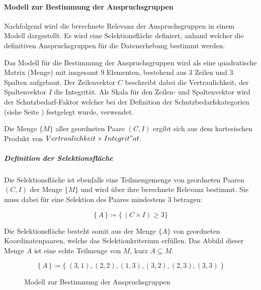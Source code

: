 \documentclass[../../main.tex]{subfiles}
\begin{document}
\paragraph*{Modell zur Bestimmung der Anspruchsgruppen}\mbox{}

\begin{sloppypar}
Nachfolgend wird die berechnete Relevanz der Anspruchsgruppen in einem Modell dargestellt. Es wird eine Selektionsfläche definiert, anhand welcher die definitiven Anspruchsgruppen für die Datenerhebung bestimmt werden.

Das Modell für die Bestimmung der Anspruchsgruppen wird als eine quadratische Matrix (Menge) mit insgesamt 9 Elementen, bestehend aus 3 Zeilen und 3 Spalten aufgebaut. Der Zeilenvektor $C$ beschreibt dabei die Vertraulichkeit, der Spaltenvektor $I$ die Integrität. Als Skala für den Zeilen- und Spaltenvektor wird der Schutzbedarf-Faktor welcher bei der Definition der Schutzbedarfskategorien (siehe Seite \pageref{Schutzbedarfskategorien}) festgelegt wurde, verwendet.

Die Menge $\{M\}$ aller geordneten Paare $(C,I)$ ergibt sich aus dem kartesischen Produkt von $Vertraulichkeit \times Integrit"at$. 
\end{sloppypar}

\subparagraph*{Definition der Selektionsfläche}\mbox{}

\begin{sloppypar}
Die Selektionsfläche ist ebenfalls eine Teilmengemenge von geordneten Paaren $(C,I)$ der Menge $\{M\}$ und wird über ihre berechnete Relevanz bestimmt. Sie muss dabei für eine Selektion des Paares mindestens 3 betragen:

\[\big\{\,A\,\big\} \coloneqq \bigg\{\,(C \times I) \geq 3 \bigg\}\]


Die Selektionsfläche besteht somit aus der Menge $\{A\}$ von geordneten Koordinatenpaaren, welche das Selektionkriterium erfüllen. Das Abbild dieser Menge $A$ ist eine echte Teilmenge von $M$, kurz $A \subsetneq M$.

\[\big\{\,A\,\big\} \coloneqq \big\{\;(3,1),(2,2),(1,3),(3,2),(2,3),(3,3)\;\big\}\]

\end{sloppypar}

\begin{figure}[H]
    \centering
    
    \caption{Modell zur Bestimmung der Anspruchsgruppen}
    \label{fig:raster1}
\end{figure}
\end{document}
